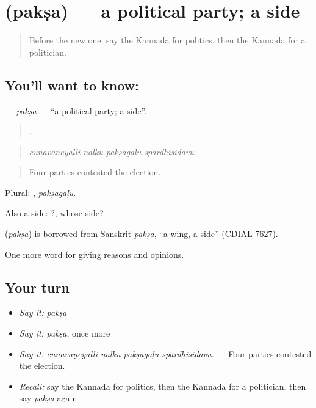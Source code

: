 \section[\texorpdfstring{\kn{ಪಕ್ಷ} (pakṣa)}{ಪಕ್ಷ (pakṣa)}]{ (pakṣa) — a political party; a side}

\label{lesson:KA-C394-paksa}



\begin{quote}
Before the new one: say the Kannada for politics, then the Kannada for a politician.
\end{quote}

\subsection*{You'll want to know: }
\textbf{} — \emph{pakṣa} — \textquotedblleft{}a political party; a side\textquotedblright{}.

\begin{quote}
   .
\end{quote}

\begin{quote}
\emph{cunāvaṇeyalli nālku pakṣagaḷu spardhisidavu.}
\end{quote}

\begin{quote}
Four parties contested the election.
\end{quote}

Plural: , \emph{pakṣagaḷu}.

Also a side:  ?, whose side?

\begin{cousinweb}
\textbf{} (\emph{pakṣa}) is borrowed from Sanskrit \emph{pakṣa}, \textquotedblleft{}a wing, a side\textquotedblright{} (CDIAL 7627).
\end{cousinweb}

\begin{grammarlens}[title={What you've built}]
One more word for giving reasons and opinions.
\end{grammarlens}

\subsection*{Your turn}
\begin{itemize}
\raggedright
  \item \emph{Say it:} \emph{pakṣa}
  \item \emph{Say it:} \emph{pakṣa}, once more
  \item \emph{Say it:} \emph{cunāvaṇeyalli nālku pakṣagaḷu spardhisidavu.} — Four parties contested the election.
  \item \emph{Recall:} say the Kannada for politics, then the Kannada for a politician, then say \emph{pakṣa} again
\end{itemize}

